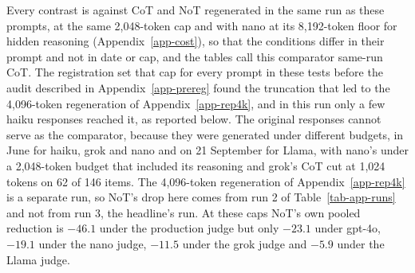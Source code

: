 Every contrast is against CoT and NoT regenerated in the same run as these
prompts, at the same 2,048-token cap and with nano at its 8,192-token floor
for hidden reasoning (Appendix~\ref{app-cost}), so that the conditions differ
in their prompt and not in date or cap, and the tables call this comparator
same-run CoT. The registration set that cap for every prompt in these tests
before the audit described in Appendix~\ref{app-prereg} found the truncation
that led to the 4,096-token regeneration of Appendix~\ref{app-rep4k}, and in
this run only a few haiku responses reached it, as reported below.
The original responses cannot serve as the
comparator, because they were generated under different budgets, in June for
haiku, grok and nano and on 21 September for Llama, with nano's under a
2,048-token budget that included its reasoning and grok's CoT cut at 1,024
tokens on 62 of 146 items. The 4,096-token regeneration of
Appendix~\ref{app-rep4k} is a separate run, so NoT's drop here comes from run
2 of Table~\ref{tab-app-runs} and not from run 3, the headline's run.
At these caps NoT's own pooled reduction is $-46.1$ under the production judge
but only $-23.1$ under gpt-4o, $-19.1$ under the nano judge, $-11.5$ under the grok judge
and $-5.9$ under the Llama judge.

